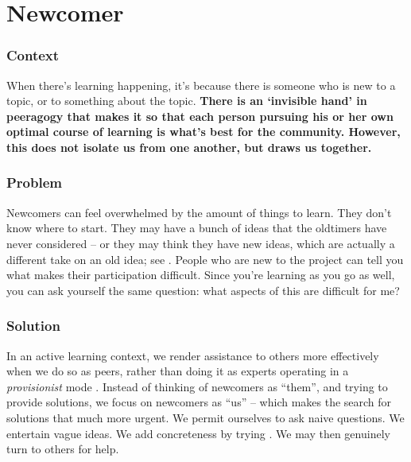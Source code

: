 

\section{Newcomer}\label{sec:Newcomer}

\subsubsection*{Context}
When there's learning happening, it's because there is someone who is new to a topic, or to something about the topic.
\textbf{There is an `invisible hand' in peeragogy that makes it so that each person pursuing his or her own optimal course of learning is what's best for the community.  However, this does not isolate us from one another, but draws us together.}

\subsubsection*{Problem} Newcomers can feel overwhelmed by the amount of things to learn.  They
don't know where to start.  They may have a bunch of ideas that the
oldtimers have never considered -- or they may think they have new
ideas, which are actually a different take on an old idea; see
. People who are new to the project can tell you what makes their participation difficult.  Since you're learning as you go as well, you can ask yourself the same question: what aspects of this are difficult for me?  

\subsubsection*{Solution}
In an active learning context, we render assistance to others more effectively when we do
so as peers, rather than doing it as experts operating in a \emph{provisionist} mode
\cite{boud2005peer}.  Instead of thinking of newcomers as
``them'', and trying to provide solutions, we focus on newcomers as
``us'' -- which makes the search for solutions that much more urgent.
We permit ourselves to ask naive questions.  We entertain vague ideas.
We add concreteness by trying .  We may then genuinely turn
to others for help. 

